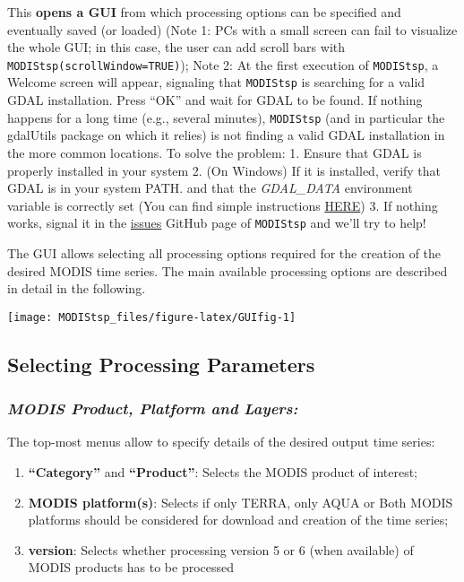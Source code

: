 \documentclass[]{article}
\providecommand{\tightlist}{%
  \setlength{\itemsep}{0pt}\setlength{\parskip}{0pt}}
\begin{document}
This \textbf{opens a GUI} from which processing options can be specified
and eventually saved (or loaded) (Note 1: PCs with a small screen can
fail to visualize the whole GUI; in this case, the user can add scroll
bars with \texttt{MODIStsp(scrollWindow=TRUE)}); Note 2: At the first
execution of \texttt{MODIStsp}, a Welcome screen will appear, signaling
that \texttt{MODIStsp} is searching for a valid GDAL installation. Press
``OK'' and wait for GDAL to be found. If nothing happens for a long time
(e.g., several minutes), \texttt{MODIStsp} (and in particular the
gdalUtils package on which it relies) is not finding a valid GDAL
installation in the more common locations. To solve the problem: 1.
Ensure that GDAL is properly installed in your system 2. (On Windows) If
it is installed, verify that GDAL is in your system PATH. and that the
\emph{GDAL\_DATA} environment variable is correctly set (You can find
simple instructions
\href{http://gisforthought.com/setting-up-your-gdal-and-ogr-environmental-variables/}{HERE})
3. If nothing works, signal it in the
\href{https://github.com/lbusett/MODIStsp/issues}{issues} GitHub page of
\texttt{MODIStsp} and we'll try to help!

The GUI allows selecting all processing options required for the
creation of the desired MODIS time series. The main available processing
options are described in detail in the following.

\begin{center}\texttt{[image: MODIStsp\_files/figure-latex/GUIfig-1]} \end{center}

\subsection{\texorpdfstring{\textbf{Selecting Processing
Parameters}}{Selecting Processing Parameters}}\label{selecting-processing-parameters}

\subsubsection{\texorpdfstring{\textbf{\emph{MODIS Product, Platform and
Layers:}}}{MODIS Product, Platform and Layers:}}\label{modis-product-platform-and-layers}

The top-most menus allow to specify details of the desired output time
series:

\begin{enumerate}
\def\labelenumi{\arabic{enumi}.}
\tightlist
\item
  \textbf{``Category''} and \textbf{``Product''}: Selects the MODIS
  product of interest;
\item
  \textbf{MODIS platform(s)}: Selects if only TERRA, only AQUA or Both
  MODIS platforms should be considered for download and creation of the
  time series;
\item
  \textbf{version}: Selects whether processing version 5 or 6 (when
  available) of MODIS products has to be processed
\end{enumerate}
\end{document}
